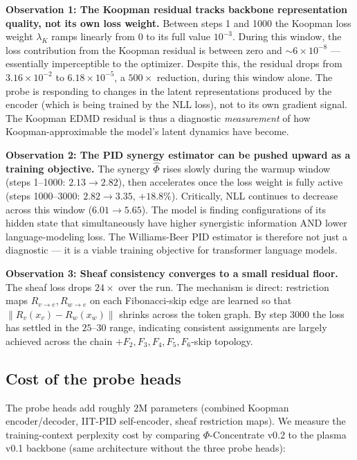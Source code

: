 \documentclass[11pt]{article}
\begin{document}
\textbf{Observation 1: The Koopman residual tracks backbone representation
quality, not its own loss weight.} Between steps 1 and 1000 the Koopman
loss weight $\lambda_K$ ramps linearly from $0$ to its full value $10^{-3}$.
During this window, the loss contribution from the Koopman residual is
between zero and $\sim 6 \times 10^{-8}$ --- essentially imperceptible to
the optimizer. Despite this, the residual drops from $3.16 \times 10^{-2}$
to $6.18 \times 10^{-5}$, a $500\times$ reduction, during this window
alone. The probe is responding to changes in the latent representations
produced by the encoder (which is being trained by the NLL loss), not to
its own gradient signal. The Koopman EDMD residual is thus a diagnostic
\emph{measurement} of how Koopman-approximable the model's latent
dynamics have become.

\textbf{Observation 2: The PID synergy estimator can be pushed upward
as a training objective.} The synergy $\hat{\Phi}$ rises slowly during
the warmup window (steps 1--1000: $2.13 \to 2.82$), then accelerates
once the loss weight is fully active (steps 1000--3000: $2.82 \to 3.35$,
$+18.8\%$). Critically, NLL continues to decrease across this window
($6.01 \to 5.65$). The model is finding configurations of its hidden
state that simultaneously have higher synergistic information AND lower
language-modeling loss. The Williams-Beer PID estimator is therefore not
just a diagnostic --- it is a viable training objective for transformer
language models.

\textbf{Observation 3: Sheaf consistency converges to a small residual
floor.} The sheaf loss drops $24\times$ over the run. The mechanism is
direct: restriction maps $R_{v\to e}, R_{w\to e}$ on each Fibonacci-skip
edge are learned so that $\| R_v(x_v) - R_w(x_w) \|$ shrinks across
the token graph. By step 3000 the loss has settled in the $25$--$30$
range, indicating consistent assignments are largely achieved across
the chain $+ F_2, F_3, F_4, F_5, F_6$-skip topology.

\subsection{Cost of the probe heads}

The probe heads add roughly $2$M parameters (combined Koopman encoder/decoder,
IIT-PID self-encoder, sheaf restriction maps). We measure the training-context
perplexity cost by comparing $\Phi$-Concentrate v0.2 to the plasma v0.1
backbone (same architecture without the three probe heads):
\end{document}
